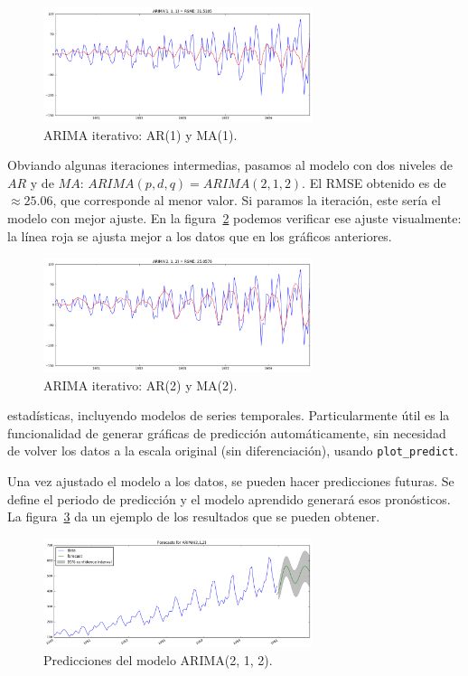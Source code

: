 \documentclass[11pt,spanish,listoffigures,listoftables]{tfgetsinf}
\begin{document}
    \begin{figure}[h]
        \centering
        \includegraphics[width=0.7\textwidth]{arima_111.png}
        \caption{ARIMA iterativo: AR(1) y MA(1).}
        \label{fig:iterative_arima_arma_1}
    \end{figure}
        
    Obviando algunas iteraciones intermedias, pasamos al modelo con dos niveles de \(AR\) y de \(MA\): \(ARIMA(p, d, q)=ARIMA(2, 1, 2)\). El RMSE obtenido es de \(\approx25.06\), que corresponde al menor valor. Si paramos la iteración, este sería el modelo con mejor ajuste. En la figura~\ref{fig:iterative_arima_arma_2} podemos verificar ese ajuste visualmente: la línea roja se ajusta mejor a los datos que en los gráficos anteriores.
  
    \begin{figure}[h]
        \centering
        \includegraphics[width=0.7\textwidth]{arima_212.png}
        \caption{ARIMA iterativo: AR(2) y MA(2).}
        \label{fig:iterative_arima_arma_2}
    \end{figure}
    
    estadísticas, incluyendo modelos de series temporales. Particularmente útil es la funcionalidad de generar gráficas de predicción automáticamente, sin necesidad de volver los datos a la escala original (sin diferenciación), usando {\tt plot\_predict}. 

    Una vez ajustado el modelo a los datos, se pueden hacer predicciones futuras. Se define el periodo de predicción y el modelo aprendido generará esos pronósticos. La figura~\ref{fig:forecast} da un ejemplo de los resultados que se pueden obtener. 

    \begin{figure}[h]
        \centering
        \includegraphics[width=0.7\textwidth]{forecast.png}
        \caption{Predicciones del modelo ARIMA(2, 1, 2).}
        \label{fig:forecast}
    \end{figure}
\end{document}
